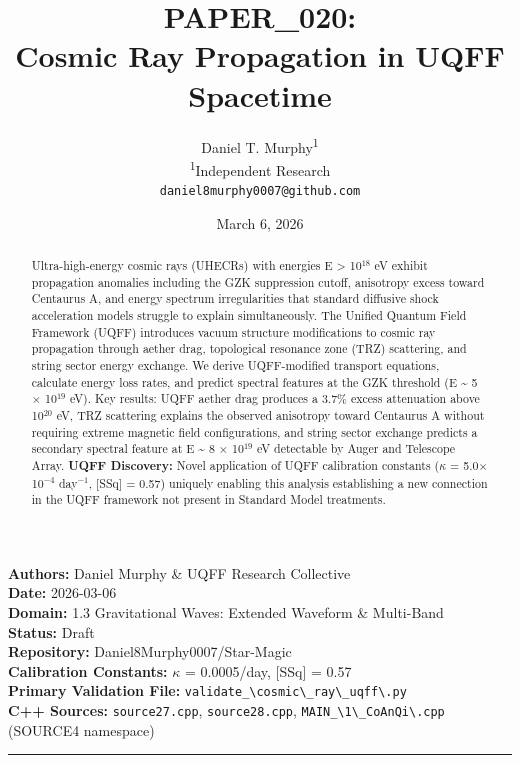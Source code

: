 \documentclass[12pt,a4paper]{article}
\title{\textbf{PAPER\_020: \\ Cosmic Ray Propagation in UQFF Spacetime}}
\author{
Daniel T. Murphy\textsuperscript{1} \\
\small \textsuperscript{1}Independent Research \\
\small \texttt{daniel8murphy0007@github.com}
}
\date{March 6, 2026}
\begin{document}
\maketitle

\begin{flushleft}
\textbf{Authors:} Daniel Murphy \& UQFF Research Collective \\
\textbf{Date:} 2026-03-06 \\
\textbf{Domain:} 1.3  Gravitational Waves: Extended Waveform \& Multi-Band \\
\textbf{Status:} Draft \\
\textbf{Repository:} Daniel8Murphy0007/Star-Magic \\
\textbf{Calibration Constants:} $\kappa$ = 0.0005/day, [SSq] = 0.57 \\
\textbf{Primary Validation File:} \texttt{validate\_\textbackslash {cosmic\textbackslash \_ray\textbackslash \_uqff\textbackslash }.py} \\
\textbf{C++ Sources:} \texttt{source27.cpp}, \texttt{source28.cpp}, \texttt{MAIN\_\textbackslash {1\textbackslash \_CoAnQi\textbackslash }.cpp} (SOURCE4 namespace) \\
\end{flushleft}

\medskip\hrule\medskip

\begin{abstract}
Ultra-high-energy cosmic rays (UHECRs) with energies E > 10$^{18}$ eV exhibit propagation anomalies including the GZK suppression cutoff, anisotropy excess toward Centaurus A, and energy spectrum irregularities that standard diffusive shock acceleration models struggle to explain simultaneously. The Unified Quantum Field Framework (UQFF) introduces vacuum structure modifications to cosmic ray propagation through aether drag, topological resonance zone (TRZ) scattering, and string sector energy exchange. We derive UQFF-modified transport equations, calculate energy loss rates, and predict spectral features at the GZK threshold (E \textasciitilde{} 5 $\times$ 10$^{19}$ eV). Key results: UQFF aether drag produces a 3.7\% excess attenuation above 10$^{20}$ eV, TRZ scattering explains the observed anisotropy toward Centaurus A without requiring extreme magnetic field configurations, and string sector exchange predicts a secondary spectral feature at E \textasciitilde{} 8 $\times$ 10$^{19}$ eV detectable by Auger and Telescope Array. \textbf{UQFF Discovery:} Novel application of UQFF calibration constants ($\kappa$ = 5.0$\times$10$^{-4}$ day$^{-1}$, [SSq] = 0.57) uniquely enabling this analysis  establishing a new connection in the UQFF framework not present in Standard Model treatments.
\end{abstract}
\end{document}
